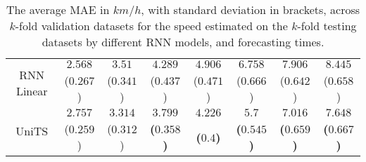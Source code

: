 \begin{table}[!ht]
{\begin{tabular}{|c|c|c|c|c|c|c|c|}
			\multirow{2}{*}{RNN Linear} & $2.568$ & $3.51$ & $4.289$ & $4.906$ & $6.758$ & $7.906$ & $8.445$ \\
			 & ($0.267$) & ($0.341$) & ($0.437$) & ($0.471$) & ($0.666$) & ($0.642$) & ($0.658$) \\ \hline
			\multirow{2}{*}{UniTS} & $2.757$ & $3.314$ & $\mathbf{3.799}$ & $\mathbf{4.226}$ & $\mathbf{5.7}$ & $\mathbf{7.016}$ & $\mathbf{7.648}$ \\
			 & ($0.259$) & ($0.312$) & \textbf{(}$\mathbf{0.358}$\textbf{)} & \textbf{(}$\mathbf{0.4}$\textbf{)} & \textbf{(}$\mathbf{0.545}$\textbf{)} & \textbf{(}$\mathbf{0.659}$\textbf{)} & \textbf{(}$\mathbf{0.667}$\textbf{)} \\ \hline
		\end{tabular}
	}
	\caption{The average MAE in $km/h$, with standard deviation in brackets, across $k$-fold validation datasets for the speed estimated on the $k$-fold testing datasets by different RNN models, and forecasting times.}
	\label{tab:mann_whitney_speed_MAE}
\end{table}

